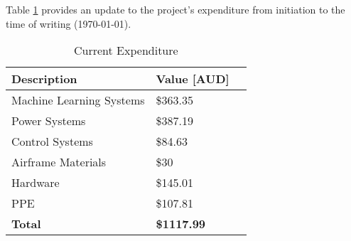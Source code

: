 Table \ref{tab:Current_Expenditure} provides an update to the project's expenditure from initiation to the time of writing (\today).

\begin{table}[H]
    \centering
    \caption{Current Expenditure}
    \begin{tabular}{|l|l|r}
    \hline
        Description & Value [AUD]\\ \hline
        Machine Learning Systems & \$363.35 \\ \hline
        Power Systems & \$387.19 \\ \hline
        Control Systems & \$84.63 \\ \hline
        Airframe Materials & \$30 \\ \hline
        Hardware & \$145.01 \\ \hline
        PPE & \$107.81 \\ \hline
        \textbf{Total} & \textbf{\$1117.99} \\\hline
    \end{tabular}
  
    \label{tab:Current_Expenditure}
\end{table}
